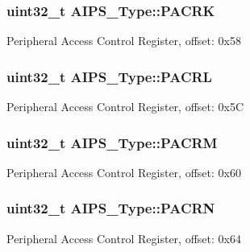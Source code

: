 \subsubsection[{\texorpdfstring{P\+A\+C\+RK}{PACRK}}]{ uint32\+\_\+t A\+I\+P\+S\+\_\+\+Type\+::\+P\+A\+C\+RK}\hypertarget{structAIPS__Type_a32a3be6292304835d8ebc3a74909f275}{}\label{structAIPS__Type_a32a3be6292304835d8ebc3a74909f275}
Peripheral Access Control Register, offset\+: 0x58 
\subsubsection[{\texorpdfstring{P\+A\+C\+RL}{PACRL}}]{ uint32\+\_\+t A\+I\+P\+S\+\_\+\+Type\+::\+P\+A\+C\+RL}\hypertarget{structAIPS__Type_ab37888e4e8a9b76c34a8e6dbfef2d89f}{}\label{structAIPS__Type_ab37888e4e8a9b76c34a8e6dbfef2d89f}
Peripheral Access Control Register, offset\+: 0x5C 
\subsubsection[{\texorpdfstring{P\+A\+C\+RM}{PACRM}}]{ uint32\+\_\+t A\+I\+P\+S\+\_\+\+Type\+::\+P\+A\+C\+RM}\hypertarget{structAIPS__Type_ae4e1fbc91c664da96edc30629678e262}{}\label{structAIPS__Type_ae4e1fbc91c664da96edc30629678e262}
Peripheral Access Control Register, offset\+: 0x60 
\subsubsection[{\texorpdfstring{P\+A\+C\+RN}{PACRN}}]{ uint32\+\_\+t A\+I\+P\+S\+\_\+\+Type\+::\+P\+A\+C\+RN}\hypertarget{structAIPS__Type_a8f4630b83e550df92ac62bec4afd02c3}{}\label{structAIPS__Type_a8f4630b83e550df92ac62bec4afd02c3}
Peripheral Access Control Register, offset\+: 0x64 
